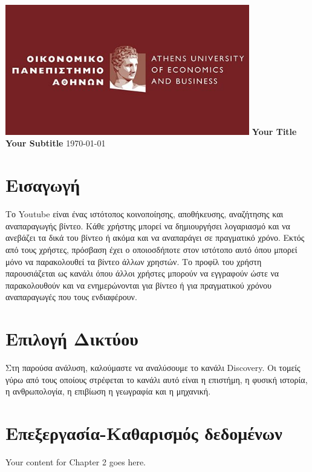 \documentclass{article}
\begin{document}
	
	\begin{titlepage}
		\centering
		\includegraphics[width=0.8\textwidth]{aueb_logo.jpg}
		\vfill
		\Huge\textbf{Your Title}
		\vspace{1cm}
		\Large\textbf{Your Subtitle}
		\vfill
		\today
	\end{titlepage}
	
	\renewcommand{\contentsname}{Περιεχόμενα}
	\tableofcontents
	
	\newpage  %
	
	\section{Εισαγωγή}
	Το Youtube είναι ένας ιστότοπος κοινοποίησης, αποθήκευσης, αναζήτησης και αναπαραγωγής βίντεο. Κάθε χρήστης μπορεί να δημιουργήσει λογαριασμό και να ανεβάζει τα δικά του βίντεο ή ακόμα και να αναπαράγει σε πραγματικό χρόνο. Εκτός από τους χρήστες, πρόσβαση έχει ο οποιοσδήποτε στον ιστότοπο αυτό όπου μπορεί μόνο να παρακολουθεί τα βίντεο άλλων χρηστών. Το προφίλ του χρήστη παρουσιάζεται ως κανάλι όπου άλλοι χρήστες μπορούν να εγγραφούν ώστε να παρακολουθούν και να ενημερώνονται για βίντεο ή για πραγματικού χρόνου αναπαραγωγές που τους ενδιαφέρουν.
	\label{chap:network_selection}  %
	
	\section{Επιλογή Δικτύου}
	Στη παρούσα ανάλυση, καλούμαστε να αναλύσουμε το κανάλι Discovery. Οι τομείς γύρω από τους οποίους στρέφεται το κανάλι αυτό είναι η επιστήμη, η φυσική ιστορία, η ανθρωπολογία, η επιβίωση η γεωγραφία και η μηχανική.
	
	\section{Επεξεργασία-Καθαρισμός δεδομένων}
	Your content for Chapter 2 goes here.
	\label{chap:data_processing}  %
	
\end{document}
